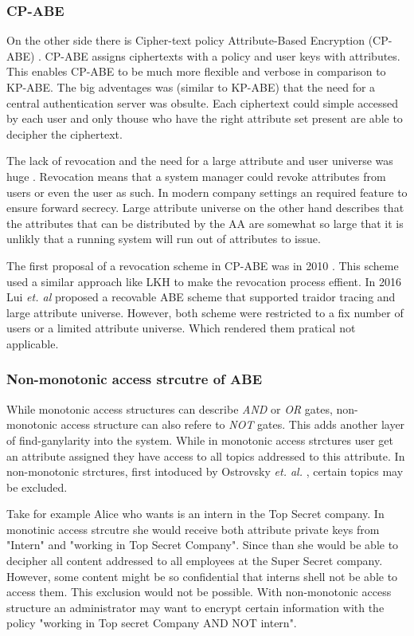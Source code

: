 \subsubsection{CP-ABE}
On the other side there is Cipher-text policy Attribute-Based Encryption (CP-ABE) \cite{bethencourt2007ciphertext}. CP-ABE assigns ciphertexts with a policy and user keys with attributes. This enables CP-ABE to be much more flexible and verbose in comparison to KP-ABE. The big adventages was (similar to KP-ABE) that the need for a central authentication server was obsulte. Each ciphertext could simple accessed by each user and only thouse who have the right attribute set present are able to decipher the ciphertext. 

The lack of revocation  and the need for a large attribute and user universe was huge . Revocation means that a system manager could revoke attributes from users or even the user as such. In modern company settings an required feature to ensure forward secrecy. Large attribute universe on the other hand describes that the attributes that can be distributed by the AA are somewhat so large that it is unlikly that a running system will run out of attributes to issue. 

The first proposal of a revocation scheme in CP-ABE was in 2010 \cite{liang2010ciphertext}. This scheme used a similar approach like LKH to make the revocation process effient. In 2016 Lui \textit{et. al} \cite{liu2016practical} proposed a recovable ABE scheme that supported traidor tracing and large attribute universe. However, both scheme were restricted to a fix number of users or a limited attribute universe. Which rendered them pratical not applicable.  

\subsubsection{Non-monotonic access strcutre of ABE}
While monotonic access structures can describe \textit{AND} or \textit{OR} gates, non-monotonic access structure can also refere to \textit{NOT} gates. This adds another layer of find-ganylarity into the system. While in monotonic access strctures user get an attribute assigned they have access to all topics addressed to this attribute. In non-monotonic strctures, first intoduced by Ostrovsky \textit{et. al.} \cite{Ostrovsky:2007:AEN:1315245.1315270}, certain topics may be excluded. 

Take for example Alice who wants is an intern in the Top Secret company. In monotinic access strcutre she would receive both attribute private keys from "Intern" and "working in Top Secret Company". Since than she would be able to decipher all content addressed to all employees at the Super Secret company. However, some content might be so confidential that interns shell not be able to access them. This exclusion would not be possible. With non-monotonic access structure an administrator may want to encrypt certain information with the policy "working in Top secret Company AND NOT intern".  

